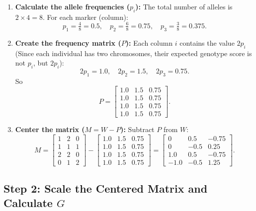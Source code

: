 \documentclass[12pt]{article}
\begin{document}
\begin{enumerate}
    \item \textbf{Calculate the allele frequencies ($p_i$):}
    The total number of alleles is $2 \times 4 = 8$. For each marker (column):
    \[
    p_1 = \tfrac{4}{8} = 0.5, \quad
    p_2 = \tfrac{6}{8} = 0.75, \quad
    p_3 = \tfrac{3}{8} = 0.375.
    \]

    \item \textbf{Create the frequency matrix ($P$):}
    Each column $i$ contains the value $2p_i$ (Since each individual has two chromosomes, their expected genotype score is not $p_i$, but $2p_i$):
    \[
    2p_1 = 1.0, \quad 2p_2 = 1.5, \quad 2p_3 = 0.75.
    \]
    So
    \[
    P =
    \begin{bmatrix}
    1.0 & 1.5 & 0.75 \\
    1.0 & 1.5 & 0.75 \\
    1.0 & 1.5 & 0.75 \\
    1.0 & 1.5 & 0.75
    \end{bmatrix}.
    \]

    \item \textbf{Center the matrix ($M = W - P$):}
    Subtract $P$ from $W$:
    \[
    M =
    \begin{bmatrix}
    1 & 2 & 0 \\
    1 & 1 & 1 \\
    2 & 2 & 0 \\
    0 & 1 & 2
    \end{bmatrix}
    -
    \begin{bmatrix}
    1.0 & 1.5 & 0.75 \\
    1.0 & 1.5 & 0.75 \\
    1.0 & 1.5 & 0.75 \\
    1.0 & 1.5 & 0.75
    \end{bmatrix}
    =
    \begin{bmatrix}
    0 & 0.5 & -0.75 \\
    0 & -0.5 & 0.25 \\
    1.0 & 0.5 & -0.75 \\
    -1.0 & -0.5 & 1.25
    \end{bmatrix}.
    \]
\end{enumerate}
\subsection*{Step 2: Scale the Centered Matrix and Calculate $G$ }
\end{document}
